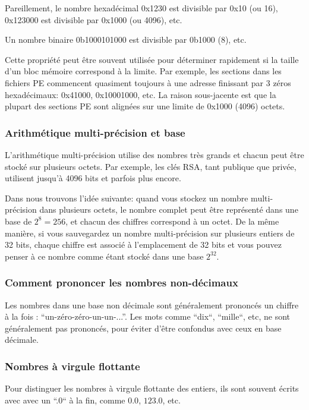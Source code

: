 Pareillement, le nombre hexadécimal 0x1230 est divisible par 0x10 (ou 16),
0x123000 est divisible par 0x1000 (ou 4096), etc.

Un nombre binaire 0b1000101000 est divisible par 0b1000 (8), etc.

Cette propriété peut être souvent utilisée pour déterminer rapidement si la taille
d'un bloc mémoire correspond à la limite. %
Par exemple, les sections dans les fichiers \ac{PE} commencent quasiment toujours
à une adresse finissant par 3 zéros hexadécimaux: 0x41000, 0x10001000, etc. La raison
sous-jacente est que la plupart des sections \ac{PE} sont alignées sur une limite
de 0x1000 (4096) octets.

\subsubsection{Arithmétique multi-précision et base}

L'arithmétique multi-précision utilise des nombres très grands et chacun peut être
stocké sur plusieurs octets. Par exemple, les clés RSA, tant publique que privée,
utilisent jusqu'à 4096 bits et parfois plus encore.

Dans  nous trouvons l'idée suivante: quand vous
stockez un nombre multi-précision dans plusieurs octets, le nombre complet peut être
représenté dans une base de $2^8=256$, et chacun des chiffres correspond à un octet.
De la même manière, si vous sauvegardez un nombre multi-précision sur plusieurs
entiers de 32 bits, chaque chiffre est associé à l'emplacement de 32 bits et vous
pouvez penser à ce nombre comme étant stocké dans une base $2^{32}$.

\subsubsection{Comment prononcer les nombres non-décimaux}

Les nombres dans une base non décimale sont généralement prononcés un chiffre à
la fois : ``un-zéro-zéro-un-un-...''. Les mots comme ``dix``, ``mille``, etc, ne
sont généralement pas prononcés, pour éviter d'être confondus avec ceux en
base décimale.

\subsubsection{Nombres à virgule flottante}

Pour distinguer les nombres à virgule flottante des entiers, ils sont souvent écrits
avec avec un ``.0`` à la fin, comme $0.0$, $123.0$, etc.
